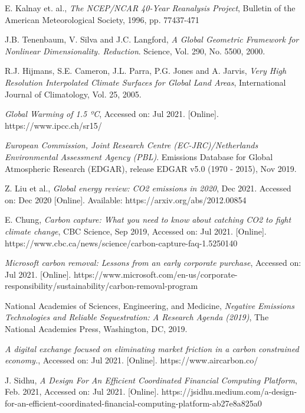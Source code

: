 \documentclass{article}
\begin{document}
\begin{thebibliography}{1}

 E. Kalnay et. al., \textit{The NCEP/NCAR 40-Year Reanalysis Project}, Bulletin of the American Meteorological Society, 1996, pp. 77437-471

 J.B. Tenenbaum, V. Silva and J.C. Langford, \textit{A Global Geometric Framework for Nonlinear Dimensionality. Reduction}. Science, Vol. 290, No. 5500, 2000.

 R.J. Hijmans, S.E. Cameron, J.L. Parra, P.G. Jones and A. Jarvis, \textit{Very High Resolution Interpolated Climate Surfaces for Global Land Areas}, International Journal of Climatology, Vol. 25, 2005.

 \textit{Global Warming of 1.5 ºC}, Accessed on: Jul 2021. [Online]. https://www.ipcc.ch/sr15/

 \textit{European Commission, Joint Research Centre (EC-JRC)/Netherlands Environmental Assessment Agency (PBL)}. Emissions Database for Global Atmospheric Research (EDGAR), release EDGAR v5.0 (1970 - 2015), Nov 2019.

 Z. Liu et al.,  \textit{Global energy review: CO2 emissions in 2020}, Dec 2021. Accessed on: Dec 2020 [Online]. Available: https://arxiv.org/abs/2012.00854

 E. Chung, \textit{Carbon capture: What you need to know about catching CO2 to fight climate change}, CBC Science, Sep 2019, Accessed on: Jul 2021. [Online]. https://www.cbc.ca/news/science/carbon-capture-faq-1.5250140

  \textit{Microsoft carbon removal: Lessons from an early corporate purchase}, Accessed on: Jul 2021. [Online]. https://www.microsoft.com/en-us/corporate-responsibility/sustainability/carbon-removal-program

 National Academies of Sciences, Engineering, and Medicine, \textit{Negative Emissions Technologies and Reliable Sequestration: A Research Agenda (2019)}, The National Academies Press, Washington, DC, 2019. 

 \textit{A digital exchange focused on eliminating market friction in a carbon constrained economy.}, Accessed on: Jul 2021. [Online]. https://www.aircarbon.co/

 J. Sidhu, \textit{A Design For An Efficient Coordinated Financial Computing Platform}, Feb. 2021, Accessed on: Jul 2021. [Online]. https://jsidhu.medium.com/a-design-for-an-efficient-coordinated-financial-computing-platform-ab27e8a825a0


\end{thebibliography}
\end{document}
